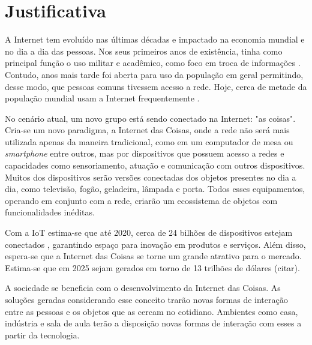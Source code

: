 \section{Justificativa}

A Internet tem evoluído nas últimas décadas e impactado na economia mundial e no dia a dia das pessoas. Nos seus primeiros anos de existência, tinha como principal função o uso militar e acadêmico, como foco em troca de informações \cite{Leiner2012}. Contudo, anos mais tarde foi aberta para uso da população em geral permitindo, desse modo, que pessoas comuns tivessem acesso a rede. Hoje, cerca de metade da população mundial usam a Internet frequentemente \cite{MiniwattsMarketingGroup2016}. 

No cenário atual, um novo grupo está sendo conectado na Internet: "as coisas". Cria-se um novo paradigma, a Internet das Coisas, onde a rede não será mais utilizada apenas da maneira tradicional, como em um computador de mesa ou \textit{smartphone} entre outros, mas por dispositivos que possuem acesso a redes e capacidades como sensoriamento, atuação e comunicação com outros dispositivos. Muitos dos dispositivos serão versões conectadas dos objetos presentes no dia a dia, como televisão, fogão, geladeira, lâmpada e porta. Todos esses equipamentos, operando em conjunto com a rede, criarão um ecossistema de objetos com funcionalidades inéditas. 

Com a IoT estima-se que até 2020, cerca de 24 bilhões de dispositivos estejam conectados \cite{Meola2016}, garantindo espaço para inovação em produtos e serviços. Além disso, espera-se que a Internet das Coisas se torne um grande atrativo para o mercado. Estima-se que em 2025 sejam gerados em torno de 13 trilhões de dólares (citar).

A sociedade se beneficia com o desenvolvimento da Internet das Coisas. As soluções geradas considerando esse conceito trarão novas formas de interação entre as pessoas e os objetos que as cercam no cotidiano. Ambientes como casa, indústria e sala de aula terão a disposição novas formas de interação com esses a partir da tecnologia. 

